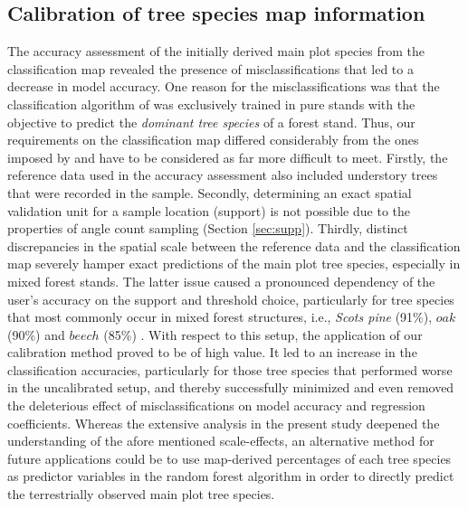 \subsection{Calibration of tree species map information}
\label{sec:calib_dis}
The accuracy assessment of the initially derived main plot species from the classification map revealed the presence of misclassifications that led to a decrease in model accuracy.  One reason for the misclassifications was that the classification algorithm of \citet{stoffels2015} was exclusively trained in pure stands with the objective to predict the \textit{dominant tree species} of a forest stand. Thus, our requirements on the classification map differed considerably from the ones imposed by \citet{stoffels2015} and have to be considered as far more difficult to meet. Firstly, the reference data used in the accuracy assessment also included understory trees that were recorded in the \bwi{} sample. Secondly, determining an exact spatial validation unit for a sample location (support) is not possible due to the properties of angle count sampling (Section \ref{sec:supp}). Thirdly, distinct discrepancies in the spatial scale between the reference data and the classification map severely hamper exact predictions of the main plot tree species, especially in mixed forest stands. The latter issue caused a pronounced dependency of the user's accuracy on the support and threshold choice, particularly for tree species that most commonly occur in mixed forest structures, i.e., \textit{Scots pine} (91\%), $oak$ (90\%) and $beech$ (85\%) \citep{bwi3}. With respect to this setup, the application of our calibration method proved to be of high value. It led to an increase in the classification accuracies, particularly for those tree species that performed worse in the uncalibrated setup, and thereby successfully minimized and even removed the deleterious effect of misclassifications on model accuracy and regression coefficients. Whereas the extensive analysis in the present study deepened the understanding of the afore mentioned scale-effects, an alternative method for future applications could be to use map-derived percentages of each tree species as predictor variables in the random forest algorithm in order to directly predict the terrestrially observed main plot tree species.


